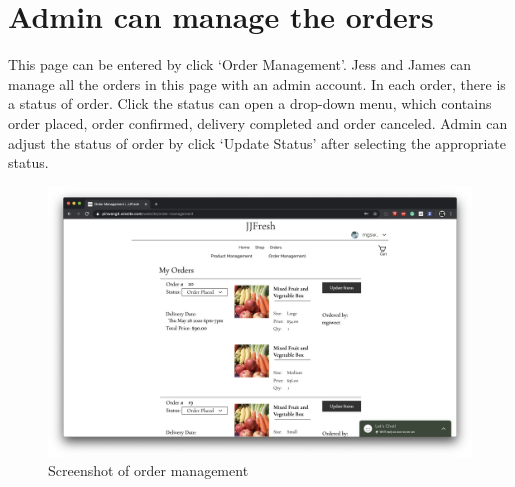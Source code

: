 \clearpage
\section*{Admin can manage the orders}
This page can be entered by click ‘Order Management’. Jess and James can manage all the orders in this page with an admin account. In each order, there is a status of order. Click the status can open a drop-down menu, which contains order placed, order confirmed, delivery completed and order canceled. Admin can adjust the status of order by click ‘Update Status’ after selecting the appropriate status.
\begin{figure}[htp]
\centering
\includegraphics[width=\textwidth]{Figures/adminOrder.png}
\caption{Screenshot of order management}
\label{fig:adminOrder}
\end{figure}

